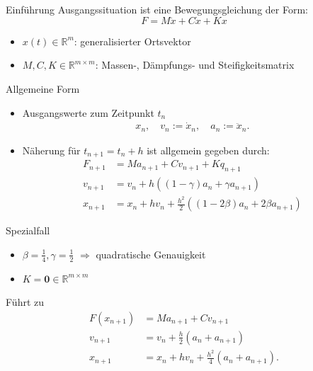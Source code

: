 \documentclass[aspectratio=169]{beamer}
\begin{document}
\begin{frame}{Einführung}
Ausgangssituation ist eine Bewegungsgleichung der Form:
\begin{equation*}
	F = M \ddot{x} + C \dot{x} + Kx
\end{equation*}

\begin{itemize}
	\item $x(t) \in \mathbb{R}^{m}$: generalisierter Ortsvektor
	\item $M, C, K \in \mathbb{R}^{m \times m}$: Massen-, Dämpfungs- und Steifigkeitsmatrix
\end{itemize}

\end{frame}


\begin{frame}{Allgemeine Form}

\begin{itemize}
\item Ausgangswerte zum Zeitpunkt $t_n$
\begin{align*}
	x_n, \quad v_n := \dot{x}_n, \quad a_n := \ddot{x}_n.
\end{align*}
\item Näherung für $t_{n+1} = t_n + h$ ist allgemein gegeben durch:
\begin{align*}
	F_{n+1} &= M a_{n+1} + C v_{n+1} + K q_{n+1}\\
	v_{n+1} &= v_{n} + h\left({\left(1 - \gamma\right) a_{n} + \gamma{a_{n+1}}}\right)\\
	x_{n+1} &= x_{n} + h v_{n} + \frac{h^2}{2} \left({\left(1 - 2\beta\right) a_{n} + 2\beta a_{n+1}}\right)
\end{align*}
\end{itemize}

\end{frame}


\begin{frame}{Spezialfall}

\begin{itemize}
	\item  $\beta = \frac{1}{4}, \gamma = \frac{1}{2}$ $\Rightarrow$ quadratische Genauigkeit
	\item $K = \mathbf{0} \in \mathbb{R}^{m \times m}$
\end{itemize}
Führt zu
\begin{align*}
	F(x_{n+1}) &= M a_{n+1} + C v_{n+1}\\
	v_{n+1} &= v_n + \frac{h}{2} (a_n + a_{n+1})\\
	x_{n+1} &= x_n + h v_n + \frac{h^2}{4} (a_n + a_{n+1}).
\end{align*}

\end{frame}
\end{document}
